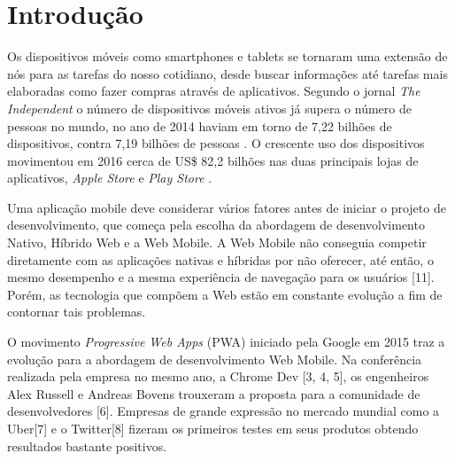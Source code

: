 \section{\esp Introdução}

Os dispositivos móveis como smartphones e tablets se tornaram uma extensão de nós para as tarefas do nosso cotidiano, desde buscar informações até tarefas mais elaboradas como fazer compras através de aplicativos. Segundo o jornal \textit{The Independent} o número de dispositivos móveis ativos já supera o número de pessoas no mundo, no ano de 2014 haviam em torno de 7,22 bilhões de dispositivos, contra 7,19 bilhões de pessoas \cite{2-independent}. O crescente uso dos dispositivos movimentou em 2016 cerca de US\$ 82,2 bilhões nas duas principais lojas de aplicativos, \textit{Apple Store} e \textit{Play Store} \cite{1-appannie}.

Uma aplicação mobile deve considerar vários fatores antes de iniciar o projeto de desenvolvimento, que começa pela escolha da abordagem de desenvolvimento Nativo, Híbrido Web e a Web Mobile. A Web Mobile não conseguia competir diretamente com as aplicações nativas e híbridas por não oferecer, até então, o mesmo desempenho e a mesma experiência de navegação para os usuários [11]. Porém, as tecnologia que compõem a Web estão em constante evolução a fim de contornar tais problemas.

O movimento \textit{Progressive Web Apps} (PWA) iniciado pela Google em 2015 traz a evolução para a abordagem de desenvolvimento Web Mobile. Na conferência realizada pela empresa no mesmo ano, a Chrome Dev [3, 4, 5], os engenheiros Alex Russell e Andreas Bovens trouxeram a proposta para a comunidade de desenvolvedores [6]. Empresas de grande expressão no mercado mundial como a Uber[7] e o Twitter[8] fizeram os primeiros testes em seus produtos obtendo resultados bastante positivos.

